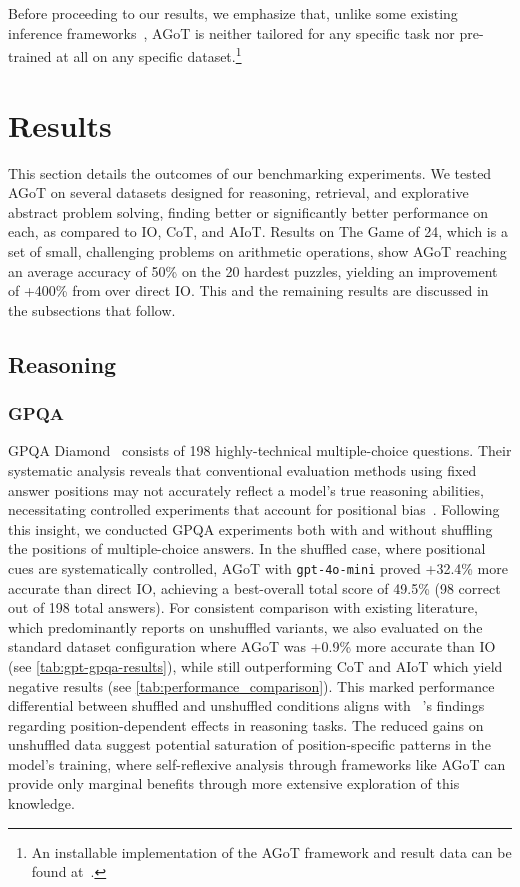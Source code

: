 \documentclass{article}
\begin{document}
Before proceeding to our results, we emphasize that, unlike some existing inference frameworks~\citep{ning2024dgotdynamicgraphthoughts,zhu2024redeltoolkitllmpoweredrecursive,wang2024tdagmultiagentframeworkbased}, AGoT is neither tailored for any specific task nor pre-trained at all on any specific dataset.\footnote{An installable implementation of the AGoT framework and result data can be found at~\citep{multi_agent_llm_2024}.}

\section{Results} \label{sec:results}
This section details the outcomes of our benchmarking experiments. We tested AGoT on several datasets designed for reasoning, retrieval, and explorative abstract problem solving, finding better or significantly better performance on each, as compared to IO, CoT, and AIoT. Results on The Game of 24, which is a set of small, challenging problems on arithmetic operations, show AGoT reaching an average accuracy of 50\% on the 20 hardest puzzles, yielding an improvement of +400\% from over direct IO. This and the remaining results are discussed in the subsections that follow.

\subsection{Reasoning}
\subsubsection{GPQA} \label{subsubsec:gpqa}
GPQA Diamond~\citep{rein2023gpqa} consists of 198 highly-technical multiple-choice questions. Their systematic analysis reveals that conventional evaluation methods using fixed answer positions may not accurately reflect a model's true reasoning abilities, necessitating controlled experiments that account for positional bias~\citep{radha2025reasoning}. Following this insight, we conducted GPQA experiments both with and without shuffling the positions of multiple-choice answers. In the shuffled case, where positional cues are systematically controlled, AGoT with \texttt{gpt-4o-mini} proved +32.4\% more accurate than direct IO, achieving a best-overall total score of 49.5\% (98 correct out of 198 total answers). For consistent comparison with existing literature, which predominantly reports on unshuffled variants, we also evaluated on the standard dataset configuration where AGoT was +0.9\% more accurate than IO (see \autoref{tab:gpt-gpqa-results}), while still outperforming CoT and AIoT which yield negative results (see \autoref{tab:performance_comparison}). This marked performance differential between shuffled and unshuffled conditions aligns with ~\citet{radha2025reasoning}'s findings regarding position-dependent effects in reasoning tasks. The reduced gains on unshuffled data suggest potential saturation of position-specific patterns in the model's training, where self-reflexive analysis through frameworks like AGoT can provide only marginal benefits through more extensive exploration of this knowledge.
\end{document}
